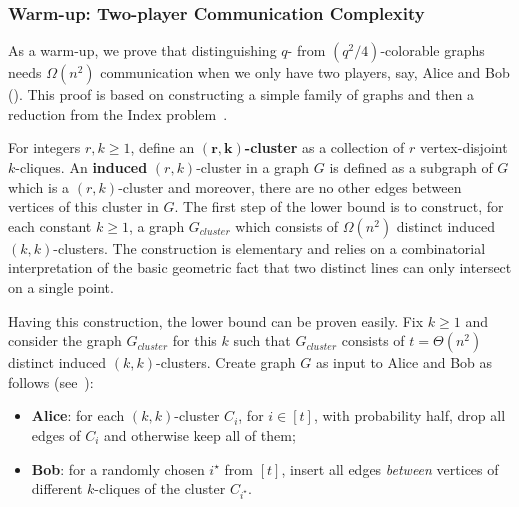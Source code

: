 \documentclass[11pt]{article}
\theoremstyle{definition}
\renewcommand{\geq}{\geqslant}
\newcommand{\istar}{\ensuremath{i^{\star}}}
\begin{document}
\subsubsection{Warm-up: Two-player Communication Complexity} 

As a warm-up, we prove that distinguishing $q$- from $(q^2/4)$-colorable graphs needs $\Omega(n^2)$ communication when we only have two players, say, Alice and Bob (). 
This proof is based on constructing a simple family of graphs and then a reduction from the Index problem~\cite{KNR95}. 

For integers $r,k \geq 1$, define an \textbf{$\bm{(r,k)}$-cluster} as a collection of $r$ vertex-disjoint $k$-cliques. 
An \textbf{induced} $(r,k)$-cluster in a graph $G$ is defined as a subgraph of $G$ which is a $(r,k)$-cluster and moreover, there are no other edges between vertices of this cluster in $G$. 
The first step of the lower bound is to construct, for each constant $k \geq 1$, a graph $G_{cluster}$ which consists of $\Omega(n^2)$ distinct induced $(k,k)$-clusters. The construction
is elementary and relies on a combinatorial interpretation of the basic geometric fact that two distinct lines can only intersect on a single point. 

Having this construction, the lower bound can be proven easily. Fix $k \geq 1$ and consider the graph $G_{cluster}$ for this $k$ such that $G_{cluster}$ consists of $t = \Theta(n^2)$ distinct induced $(k,k)$-clusters. Create graph $G$ as input to Alice and Bob as follows (see~): 
\begin{itemize}
	\item \textbf{Alice}: for each $(k,k)$-cluster $C_i$, for $i\in [t]$, with probability half, drop all edges of $C_i$  and otherwise keep all of them;
	\item \textbf{Bob}: for a randomly chosen $\istar$ from $[t]$, insert all edges \emph{between} vertices of different $k$-cliques of the cluster $C_{\istar}$. 
\end{itemize}
\end{document}
